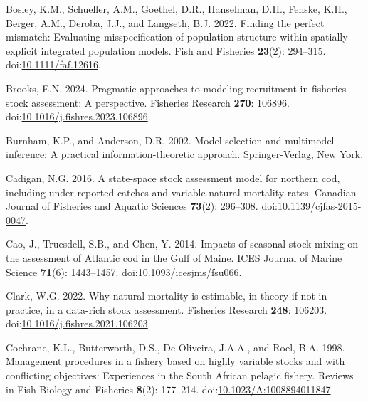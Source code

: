 \begin{CSLReferences}{1}{0}
\leavevmode{}%
Bosley, K.M., Schueller, A.M., Goethel, D.R., Hanselman, D.H., Fenske, K.H., Berger, A.M., Deroba, J.J., and Langseth, B.J. 2022. Finding the perfect mismatch: Evaluating misspecification of population structure within spatially explicit integrated population models. Fish and Fisheries \textbf{23}(2): 294--315. doi:\href{https://doi.org/10.1111/faf.12616}{10.1111/faf.12616}.

\leavevmode{}%
Brooks, E.N. 2024. Pragmatic approaches to modeling recruitment in fisheries stock assessment: A perspective. Fisheries Research \textbf{270}: 106896. doi:\href{https://doi.org/10.1016/j.fishres.2023.106896}{10.1016/j.fishres.2023.106896}.

\leavevmode{}%
Burnham, K.P., and Anderson, D.R. 2002. Model selection and multimodel inference: A practical information-theoretic approach. Springer-Verlag, New York.

\leavevmode{}%
Cadigan, N.G. 2016. A state-space stock assessment model for northern cod, including under-reported catches and variable natural mortality rates. Canadian Journal of Fisheries and Aquatic Sciences \textbf{73}(2): 296--308. doi:\href{https://doi.org/10.1139/cjfas-2015-0047}{10.1139/cjfas-2015-0047}.

\leavevmode{}%
Cao, J., Truesdell, S.B., and Chen, Y. 2014. Impacts of seasonal stock mixing on the assessment of {A}tlantic cod in the {G}ulf of {M}aine. ICES Journal of Marine Science \textbf{71}(6): 1443--1457. doi:\href{https://doi.org/10.1093/icesjms/fsu066}{10.1093/icesjms/fsu066}.

\leavevmode{}%
Clark, W.G. 2022. Why natural mortality is estimable, in theory if not in practice, in a data-rich stock assessment. Fisheries Research \textbf{248}: 106203. doi:\href{https://doi.org/10.1016/j.fishres.2021.106203}{10.1016/j.fishres.2021.106203}.

\leavevmode{}%
Cochrane, K.L., Butterworth, D.S., De Oliveira, J.A.A., and Roel, B.A. 1998. Management procedures in a fishery based on highly variable stocks and with conflicting objectives: Experiences in the {S}outh {A}frican pelagic fishery. Reviews in Fish Biology and Fisheries \textbf{8}(2): 177--214. doi:\href{https://doi.org/10.1023/A:1008894011847}{10.1023/A:1008894011847}.


\end{CSLReferences}
